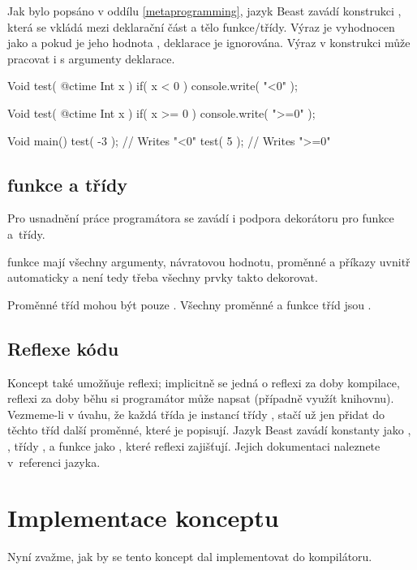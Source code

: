 Jak bylo popsáno v oddílu \ref{metaprogramming}, jazyk Beast zavádí konstrukci , která se vkládá mezi deklarační část a tělo funkce/třídy. Výraz  je vyhodnocen jako  a pokud je jeho hodnota , deklarace je ignorována. Výraz v konstrukci může pracovat i s \ctime argumenty deklarace.

\begin{code}
Void test( @ctime Int x )
	if( x < 0 )
{
	console.write( "<0" );
}

Void test( @ctime Int x )
	if( x >= 0 )
{
	console.write( ">=0" );
}

Void main() {
	test( -3 ); // Writes "<0"
	test( 5 ); // Writes ">=0"
}
\end{code}

\subsection{\ctime funkce a třídy}
Pro usnadnění práce programátora se zavádí i podpora dekorátoru  pro funkce a~třídy.

\ctime funkce mají všechny argumenty, návratovou hodnotu, proměnné a příkazy uvnitř automaticky \ctime a není tedy třeba všechny prvky takto dekorovat.

Proměnné \ctime tříd mohou být pouze \ctime. Všechny proměnné a funkce \ctime tříd jsou \ctime.

\subsection{Reflexe kódu} \label{ctime:reflection}
Koncept také umožňuje reflexi; implicitně se jedná o reflexi za doby kompilace, reflexi za doby běhu si programátor může napsat (případně využít knihovnu). Vezmeme-li v úvahu, že každá třída je instancí \ctime třídy , stačí už jen přidat do těchto tříd další \ctime proměnné, které je popisují. Jazyk Beast zavádí \ctime konstanty jako , , třídy ,  a funkce jako , které reflexi zajišťují. Jejich dokumentaci naleznete v~referenci jazyka.

\section{Implementace konceptu}
Nyní zvažme, jak by se tento koncept dal implementovat do kompilátoru.

